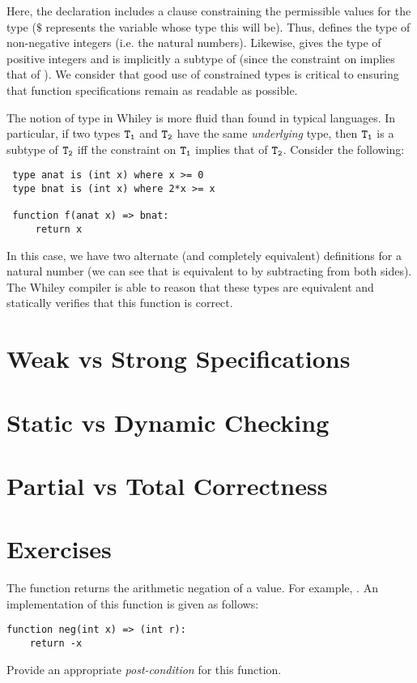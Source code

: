 Here, the  declaration includes a 
clause constraining the permissible values for the type ($\$$
represents the variable whose type this will be).  Thus,
 defines the type of non-negative integers (i.e. the
natural numbers).  Likewise,  gives the type of
positive integers and is implicitly a subtype of 
(since the constraint on  implies that of
).  We consider that good use of constrained types is
critical to ensuring that function specifications remain as readable
as possible.

The notion of type in Whiley is more fluid than found in typical
languages.  In particular, if two types ${\tt T_1}$ and ${\tt T_2}$
have the same {\em underlying} type, then ${\tt T_1}$ is a subtype of
${\tt T_2}$ iff the constraint on ${\tt T_1}$ implies that of ${\tt
  T_2}$.  Consider the following:

\begin{lstlisting}
 type anat is (int x) where x >= 0
 type bnat is (int x) where 2*x >= x

 function f(anat x) => bnat:
     return x
\end{lstlisting}
In this case, we have two alternate (and completely equivalent)
definitions for a natural number (we can see that  is
equivalent to  by subtracting  from both sides).
The Whiley compiler is able to reason that these types are equivalent
and statically verifies that this function is correct.

\section{Weak vs Strong Specifications}
\section{Static vs Dynamic Checking}
\section{Partial vs Total Correctness}

\section{Exercises}

\begin{ex}
The function  returns the arithmetic negation of a value.
For example, .  An implementation of
this function is given as follows:
\begin{lstlisting}
function neg(int x) => (int r):
    return -x
\end{lstlisting}
Provide an appropriate {\em post-condition} for this function.
\end{ex}

